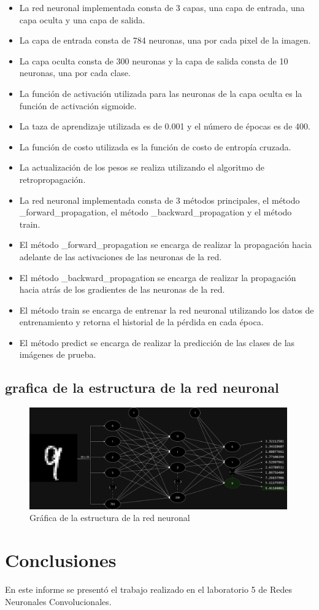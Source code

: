 \documentclass{article}
\begin{document}
    \begin{itemize}
        \item La red neuronal implementada consta de 3 capas, una capa de entrada, una capa oculta y una capa de salida.
        \item La capa de entrada consta de 784 neuronas, una por cada pixel de la imagen.
        \item La capa oculta consta de 300 neuronas y la capa de salida consta de 10 neuronas, una por cada clase.
        \item La función de activación utilizada para las neuronas de la capa oculta es la función de activación sigmoide.
        \item La taza de aprendizaje utilizada es de 0.001 y el número de épocas es de 400.
        \item La función de costo utilizada es la función de costo de entropía cruzada.
        \item La actualización de los pesos se realiza utilizando el algoritmo de retropropagación.
        \item La red neuronal implementada consta de 3 métodos principales, el método \_forward\_propagation, el método \_backward\_propagation y el método train.
        \item El método \_forward\_propagation se encarga de realizar la propagación hacia adelante de las activaciones de las neuronas de la red.
        \item El método \_backward\_propagation se encarga de realizar la propagación hacia atrás de los gradientes de las neuronas de la red.
        \item El método train se encarga de entrenar la red neuronal utilizando los datos de entrenamiento y retorna el historial de la pérdida en cada época.
        \item El método predict se encarga de realizar la predicción de las clases de las imágenes de prueba.
    \end{itemize}

    \subsection{grafica de la estructura de la red neuronal}
    \begin{figure}[h]
        \centering
        \includegraphics[width=0.99\textwidth]{img/red}
        \caption{Gráfica de la estructura de la red neuronal}
        \label{fig:red_neuronal}
    \end{figure}







    \section{Conclusiones}
    \noindent
    En este informe se presentó el trabajo realizado en el laboratorio 5 de Redes Neuronales Convolucionales.
\end{document}
